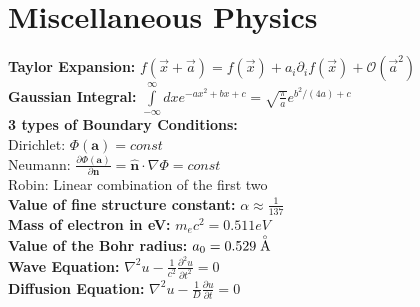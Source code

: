 \documentclass[12pt]{extarticle}
\renewcommand{\AA}{\buildrel _\circ \over {\mathrm{A}}}
\begin{document}
\section{Miscellaneous Physics}
\textbf{Taylor Expansion:} $f(\vec{x}+\vec{a}) = f(\vec{x}) + a_i\partial_i f(\vec{x}) + \mathcal{O}(\vec{a}^2)$ \\
\textbf{Gaussian Integral:} $\int\limits_{-\infty}^\infty dx e^{-ax^2+bx+c} = \sqrt{\frac{\pi}{a}}e^{b^2/(4a)+c}$ \\
\textbf{3 types of Boundary Conditions:} \\
Dirichlet: $\Phi(\mathbf{a}) = const$ \\
Neumann: $\frac{\partial \Phi(\mathbf{a})}{\partial \mathbf{n}} = \hat{\mathbf{n}}\cdot\nabla\Phi = const$ \\
Robin: Linear combination of the first two \\
\textbf{Value of fine structure constant:} $\alpha \approx \frac{1}{137}$ \\
\textbf{Mass of electron in eV:} $m_ec^2 = 0.511 eV$ \\
\textbf{Value of the Bohr radius:} $a_0 = 0.529 \AA$ \\
\textbf{Wave Equation:} $\nabla^2 u - \frac{1}{c^2}\frac{\partial^2 u}{\partial t^2} = 0$ \\
\textbf{Diffusion Equation:} $\nabla^2 u - \frac{1}{D}\frac{\partial u}{\partial t} = 0$ \\
\end{document}
